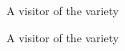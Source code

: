 \documentclass[onecolumn,11pt,nocopyrightspace]{sigplanconf}
\begin{document}

\begin{figure}[p]
\vspace{-\baselineskip}
\caption{A visitor of the \itertwo variety}
\label{fig:expr02}
\end{figure}

\begin{figure}[p]
\vspace{-\baselineskip}
\caption{A visitor of the \maptwo variety}
\label{fig:expr03}
\end{figure}

\end{document}
